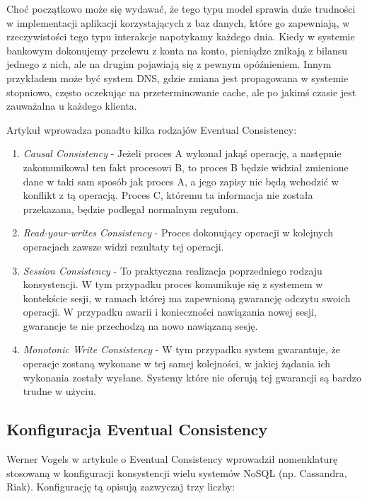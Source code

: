Choć początkowo może się wydawać, że tego typu model sprawia duże trudności w implementacji aplikacji korzystających z baz danych, które go zapewniają, w rzeczywistości tego typu interakcje napotykamy każdego dnia.
Kiedy w systemie bankowym dokonujemy przelewu z konta na konto, pieniądze znikają z bilansu jednego z nich, ale na drugim pojawiają się z pewnym opóźnieniem.
Innym przykładem może być system DNS, gdzie zmiana jest propagowana w systemie stopniowo, często oczekując na przeterminowanie cache, ale po jakimś czasie jest zauważalna u każdego klienta.

Artykuł \cite{vogels-eventually-consistent} wprowadza ponadto kilka rodzajów Eventual Consistency:

\begin{enumerate}
 \item \emph{Causal Consistency} - Jeżeli proces A wykonał jakąś operację, a następnie zakomunikował ten fakt procesowi B, to proces B będzie widział zmienione dane w taki sam sposób jak proces A, a jego zapisy nie będą wchodzić w konflikt z tą operacją.
 Proces C, któremu ta informacja nie została przekazana, będzie podlegał normalnym regułom.
 \item \emph{Read-your-writes Consistency} - Proces dokonujący operacji w kolejnych operacjach zawsze widzi rezultaty tej operacji.
 \item \emph{Session Consistency} - To praktyczna realizacja poprzedniego rodzaju konsystencji.
 W tym przypadku proces komunikuje się z systemem w kontekście sesji, w ramach której ma zapewnioną gwarancję odczytu swoich operacji.
 W przypadku awarii i konieczności nawiązania nowej sesji, gwarancje te nie przechodzą na nowo nawiązaną sesję.
 \item \emph{Monotonic Write Consistency} - W tym przypadku system gwarantuje, że operacje zostaną wykonane w tej samej kolejności, w jakiej żądania ich wykonania zostały wysłane.
 Systemy które nie oferują tej gwarancji są bardzo trudne w użyciu.
\end{enumerate}

\subsection*{Konfiguracja Eventual Consistency}

Werner Vogels w artykule o Eventual Consistency \cite{vogels-eventually-consistent} wprowadził nomenklaturę stosowaną w konfiguracji konsystencji wielu systemów NoSQL (np. Cassandra, Riak).
Konfigurację tą opisują zazwyczaj trzy liczby:

